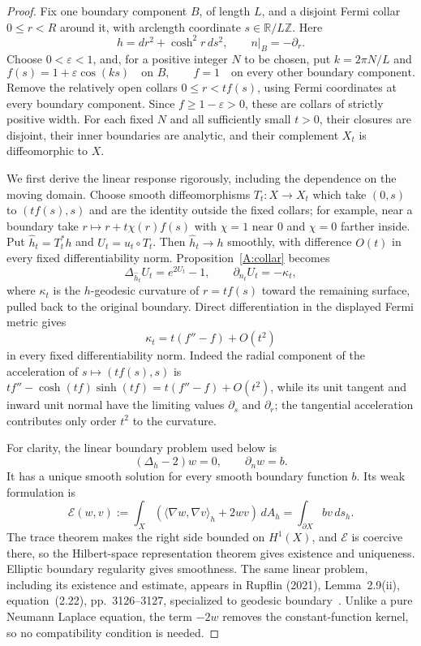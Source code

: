 \begin{proof}
Fix one boundary component $B$, of length $L$, and a disjoint Fermi collar $0\le r<R$ around it, with arclength coordinate $s\in\mathbb R/L\mathbb Z$. Here
\[
 h=dr^2+\cosh^2r\,ds^2,
 \qquad n|_B=-\partial_r.
\]
Choose $0<\varepsilon<1$, and, for a positive integer $N$ to be chosen, put $k=2\pi N/L$ and
\[
 f(s)=1+\varepsilon\cos(ks)\quad\text{on }B,
 \qquad f=1\quad\text{on every other boundary component}.
\]
Remove the relatively open collars $0\le r<t f(s)$, using Fermi coordinates at every boundary component. Since $f\ge1-\varepsilon>0$, these are collars of strictly positive width. For each fixed $N$ and all sufficiently small $t>0$, their closures are disjoint, their inner boundaries are analytic, and their complement $X_t$ is diffeomorphic to $X$.

We first derive the linear response rigorously, including the dependence on the moving domain. Choose smooth diffeomorphisms $T_t:X\to X_t$ which take $(0,s)$ to $(tf(s),s)$ and are the identity outside the fixed collars; for example, near a boundary take $r\mapsto r+t\chi(r)f(s)$ with $\chi=1$ near $0$ and $\chi=0$ farther inside. Put $\widehat h_t=T_t^*h$ and $U_t=u_t\circ T_t$. Then $\widehat h_t\to h$ smoothly, with difference $O(t)$ in every fixed differentiability norm. Proposition~\ref{A:collar} becomes
\begin{equation}
 \Delta_{\widehat h_t}U_t=e^{2U_t}-1,
 \qquad \partial_{n_t}U_t=-\kappa_t,
 \label{C:eq-collar-pulled}
\end{equation}
where $\kappa_t$ is the $h$-geodesic curvature of $r=tf(s)$ toward the remaining surface, pulled back to the original boundary. Direct differentiation in the displayed Fermi metric gives
\begin{equation}
 \kappa_t=t(f''-f)+O(t^2)
 \label{C:eq-collar-curvature}
\end{equation}
in every fixed differentiability norm. Indeed the radial component of the acceleration of $s\mapsto(tf(s),s)$ is $t f''-\cosh(tf)\sinh(tf)=t(f''-f)+O(t^2)$, while its unit tangent and inward unit normal have the limiting values $\partial_s$ and $\partial_r$; the tangential acceleration contributes only order $t^2$ to the curvature.

For clarity, the linear boundary problem used below is
\begin{equation}
 (\Delta_h-2)w=0,\qquad \partial_nw=b.
 \label{C:eq-collar-linear}
\end{equation}
It has a unique smooth solution for every smooth boundary function $b$. Its weak formulation is
\[
 \mathcal E(w,v):=\int_X
       (\langle\nabla w,\nabla v\rangle_h+2wv)\,dA_h
   =\int_{\partial X}bv\,ds_h.
\]
The trace theorem makes the right side bounded on $H^1(X)$, and $\mathcal E$ is coercive there, so the Hilbert-space representation theorem gives existence and uniqueness. Elliptic boundary regularity gives smoothness. The same linear problem, including its existence and estimate, appears in Rupflin (2021), Lemma~2.9(ii), equation~(2.22), pp.~3126--3127, specialized to geodesic boundary~\cite{C_Rupflin2021}. Unlike a pure Neumann Laplace equation, the term $-2w$ removes the constant-function kernel, so no compatibility condition is needed.


\end{proof}
